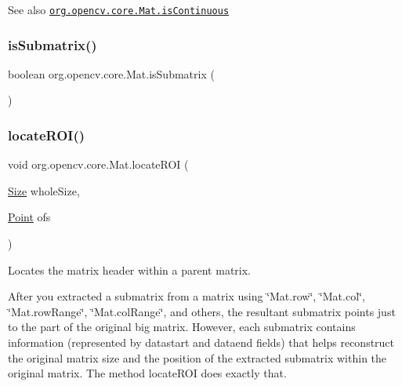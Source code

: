\begin{DoxySeeAlso}{See also}
\href{http://docs.opencv.org/modules/core/doc/basic_structures.html#mat-iscontinuous}{\tt org.\+opencv.\+core.\+Mat.\+is\+Continuous} 
\end{DoxySeeAlso}
\mbox{\label{classorg_1_1opencv_1_1core_1_1_mat_a5a8e2cf2e6d2951ba8c939a4c351793a}} 
\subsubsection{\texorpdfstring{is\+Submatrix()}{isSubmatrix()}}
{\footnotesize\ttfamily boolean org.\+opencv.\+core.\+Mat.\+is\+Submatrix (\begin{DoxyParamCaption}{ }\end{DoxyParamCaption})}

\mbox{\label{classorg_1_1opencv_1_1core_1_1_mat_a51784a0e99c00a52e8be330cf05710f8}} 
\subsubsection{\texorpdfstring{locate\+R\+O\+I()}{locateROI()}}
{\footnotesize\ttfamily void org.\+opencv.\+core.\+Mat.\+locate\+R\+OI (\begin{DoxyParamCaption}\item[{\mbox{\hyperlink{classorg_1_1opencv_1_1core_1_1_size}{Size}}}]{whole\+Size,  }\item[{\mbox{\hyperlink{classorg_1_1opencv_1_1core_1_1_point}{Point}}}]{ofs }\end{DoxyParamCaption})}

Locates the matrix header within a parent matrix.

After you extracted a submatrix from a matrix using \char`\"{}\+Mat.\+row\char`\"{}, \char`\"{}\+Mat.\+col\char`\"{}, \char`\"{}\+Mat.\+row\+Range\char`\"{}, \char`\"{}\+Mat.\+col\+Range\char`\"{}, and others, the resultant submatrix points just to the part of the original big matrix. However, each submatrix contains information (represented by {\ttfamily datastart} and {\ttfamily dataend} fields) that helps reconstruct the original matrix size and the position of the extracted submatrix within the original matrix. The method {\ttfamily locate\+R\+OI} does exactly that.


